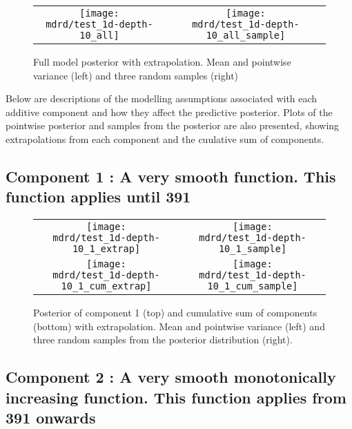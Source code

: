\documentclass{article} %
\begin{document}
\begin{figure}[H]
\newcommand{\wmgd}{0.5\columnwidth}
\newcommand{\hmgd}{3.0cm}
\newcommand{\mdrd}{test_1d-depth-10}
\newcommand{\mbm}{\hspace{-0.3cm}}
\begin{tabular}{cc}
\mbm \texttt{[image: \\mdrd/test\_1d-depth-10\_all]} & \texttt{[image: \\mdrd/test\_1d-depth-10\_all\_sample]}
\end{tabular}
\caption{Full model posterior with extrapolation. Mean and pointwise variance (left) and three random samples (right)}
\label{fig:extrap}
\end{figure}

Below are descriptions of the modelling assumptions associated with each additive component and how they affect the predictive posterior.
Plots of the pointwise posterior and samples from the posterior are also presented, showing extrapolations from each component and the cuulative sum of components.

\subsection{Component 1 : A very smooth function. This function applies until  391}



\begin{figure}[H]
\newcommand{\wmgd}{0.5\columnwidth}
\newcommand{\hmgd}{3.0cm}
\newcommand{\mdrd}{test_1d-depth-10}
\newcommand{\mbm}{\hspace{-0.3cm}}
\begin{tabular}{cc}
\mbm \texttt{[image: \\mdrd/test\_1d-depth-10\_1\_extrap]} & \texttt{[image: \\mdrd/test\_1d-depth-10\_1\_sample]} \\
\mbm \texttt{[image: \\mdrd/test\_1d-depth-10\_1\_cum\_extrap]} & \texttt{[image: \\mdrd/test\_1d-depth-10\_1\_cum\_sample]}
\end{tabular}
\caption{Posterior of component 1 (top) and cumulative sum of components (bottom) with extrapolation. Mean and pointwise variance (left) and three random samples from the posterior distribution (right).}
\label{fig:extrap1}
\end{figure}

\subsection{Component 2 : A very smooth monotonically increasing function. This function applies from  391 onwards}
\end{document}
